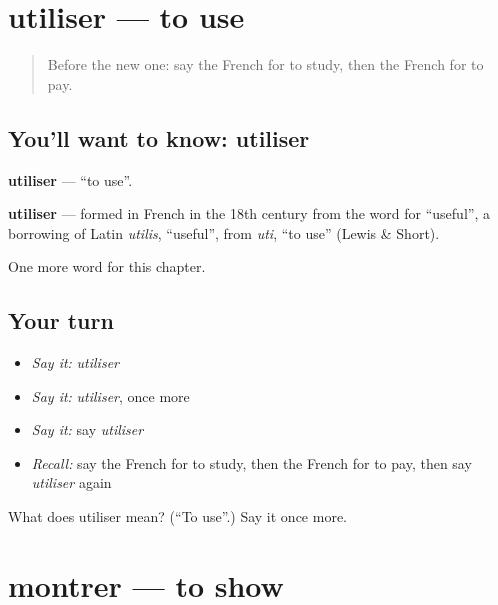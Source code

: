 \section[utiliser]{utiliser — to use}

\label{lesson:FR-C62-utiliser}



\begin{quote}
Before the new one: say the French for to study, then the French for to pay.
\end{quote}

\subsection*{You'll want to know: utiliser}
\textbf{utiliser} — \textquotedblleft{}to use\textquotedblright{}.

\begin{cousinweb}
\textbf{utiliser} — formed in French in the 18th century from the word for \textquotedblleft{}useful\textquotedblright{}, a borrowing of Latin \emph{utilis}, \textquotedblleft{}useful\textquotedblright{}, from \emph{uti}, \textquotedblleft{}to use\textquotedblright{} (Lewis \& Short).
\end{cousinweb}

\begin{grammarlens}[title={What you've built}]
One more word for this chapter.
\end{grammarlens}

\subsection*{Your turn}
\begin{itemize}
\raggedright
  \item \emph{Say it:} \emph{utiliser}
  \item \emph{Say it:} \emph{utiliser}, once more
  \item \emph{Say it:} say \emph{utiliser}
  \item \emph{Recall:} say the French for to study, then the French for to pay, then say \emph{utiliser} again
\end{itemize}

\begin{tcolorbox}[breakable,colback=teal!4,colframe=teal!35!black,title={Before you move on}]
What does utiliser mean? (\textquotedblleft{}To use\textquotedblright{}.) Say it once more.
\end{tcolorbox}
\section[montrer]{montrer — to show}

